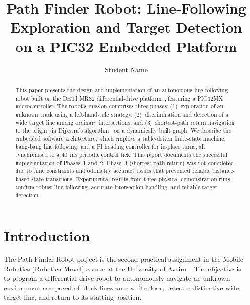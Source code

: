 \documentclass[runningheads]{llncs}
\begin{document}
\title{Path Finder Robot: Line-Following Exploration and Target Detection on a PIC32 Embedded Platform}

\author{Student Name}


\maketitle

\begin{abstract}
This paper presents the design and implementation of an autonomous line-following robot built on the DETI MR32 differential-drive platform~\cite{detimr32}, featuring a PIC32MX microcontroller. The robot's mission comprises three phases: (1)~exploration of an unknown track using a left-hand-rule strategy, (2)~discrimination and detection of a wide target line among ordinary intersections, and (3)~shortest-path return navigation to the origin via Dijkstra's algorithm~\cite{dijkstra1959} on a dynamically built graph. We describe the embedded software architecture, which employs a table-driven finite-state machine, bang-bang line following, and a PI heading controller for in-place turns, all synchronised to a 40~ms periodic control tick. This report documents the successful implementation of Phases~1 and~2. Phase~3 (shortest-path return) was not completed due to time constraints and odometry accuracy issues that prevented reliable distance-based state transitions. Experimental results from three physical demonstration runs confirm robust line following, accurate intersection handling, and reliable target detection.

\end{abstract}

\section{Introduction}\label{sec:intro}

The Path Finder Robot project is the second practical assignment in the Mobile Robotics (Robotica Movel) course at the University of Aveiro~\cite{assignment2024}. The objective is to program a differential-drive robot to autonomously navigate an unknown environment composed of black lines on a white floor, detect a distinctive wide target line, and return to its starting position.
\end{document}
